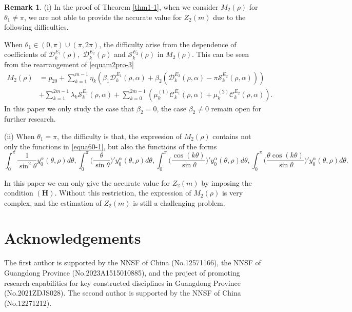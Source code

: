 \documentclass[11pt]{amsart}
\theoremstyle{remark}
\theoremstyle{definition}
\newtheorem{rem}[thm]{Remark}
\begin{document}
\begin{rem}  (i) In the proof of Theorem \ref{thm1-1}, when we consider $M_2(\rho)$ for $\theta_1\neq\pi$,   we are not able to provide the accurate value for $Z_2(m)$ due to the following difficulties.

 When $\theta_1\in (0,\pi)\cup (\pi, 2\pi)$,  the    difficulty  arise from   the  dependence  of coefficients of
$\mathcal{D}_{k}^{E_1}(\rho),$ $\mathcal{D}_{k}^{E_2}(\rho)$ and $\mathcal{S}_{k}^{E_2}(\rho)$ in    $M_2(\rho)$. This can be seen from the rearrangement of \eqref{equam2pro-3}
\begin{equation*} \label{equam2pro-33}
\begin{split}
M_2(\rho)&=p_{20}+\sum_{k=1}^{m-1}\eta_{k}\left(\beta_1\mathcal{D}_{k}^{E_1}(\rho,\alpha)
+\beta_2(\mathcal{D}_{k}^{E_2}(\rho,\alpha)-\pi\mathcal{S}_{k}^{E_2}(\rho,\alpha))\right)\\
&+\sum_{k=1}^{2m-1}\lambda_k\mathcal{S}_{k}^{E_1}(\rho,\alpha)
+\sum_{k=0}^{2m-1}\left(\mu_k^{(1)}\mathcal{C}_{k}^{E_1}(\rho,\alpha)+\mu_k^{(2)}\mathcal{C}_{k}^{E_2}(\rho,\alpha)\right).
\end{split}\end{equation*}
In this paper we only study the case that $ \beta_2=0$, the case  $ \beta_2\neq 0$
remain open for   further research.

(ii) When  $\theta_1=\pi$,   the    difficulty  is that,    the expreesion of   $M_2(\rho)$ contains not only the functions in \eqref{equa60-1}, but also the  functions of the forms
$$  \int_{0}^{\pi}\frac{1}{\sin^2 \theta} y_0^{\alpha}(\theta,\rho)d \theta,     \int_{0}^{\pi}\bigg(\frac{\theta}{\sin \theta}\bigg)' y_0^{\alpha}(\theta,\rho)d \theta,   \int_{0}^{\pi}\bigg(\frac{\cos(k\theta)}{\sin \theta}\bigg)' y_0^{\alpha}(\theta,\rho)d \theta, \int_{0}^{\pi}\bigg(\frac{\theta\cos(k\theta)}{\sin\theta}\bigg)' y_0^{\alpha}(\theta,\rho)d \theta.$$


In this paper  we can only  give the  accurate value for $Z_2(m)$ by imposing   the condition $(\mathbf{H})$.   Without this restriction, the expression of
$M_2(\rho)$ is very complex, and the estimation of  $Z_2(m)$  is still  a challenging problem.

\end{rem}

\section*{Acknowledgements}
The first  author is supported by    the NNSF of China (No.12571166),
  the NNSF
of Guangdong Province  (No.2023A1515010885),  and the project of promoting research capabilities for key constructed disciplines in Guangdong Province (No.2021ZDJS028).
The second  author is supported by    the NNSF of China (No.12271212).
\end{document}
